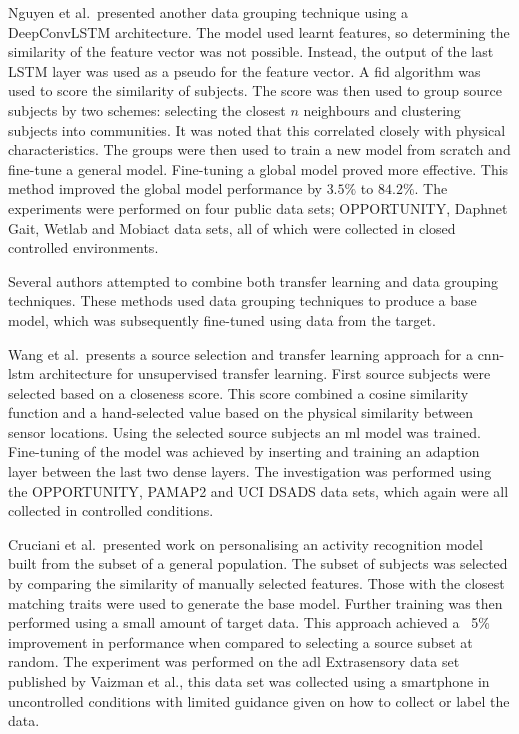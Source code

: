 Nguyen et al.~presented another data grouping technique using a DeepConvLSTM architecture. The model used learnt features, so determining the similarity of the feature vector was not possible. Instead, the output of the last LSTM layer was used as a pseudo for the feature vector. A \acrfull{fid} algorithm was used to score the similarity of subjects. The score was then used to group source subjects by two schemes: selecting the closest $n$ neighbours and clustering subjects into communities. It was noted that this correlated closely with physical characteristics. The groups were then used to train a new model from scratch and fine-tune a general model. Fine-tuning a global model proved more effective. This method improved the global model performance by $3.5\%$ to $84.2\%$. The experiments were performed on four public data sets; OPPORTUNITY\cite{Roggen2009}, Daphnet Gait\cite{Sigcha2020}, Wetlab\cite{Scholl2015} and Mobiact\cite{Vavoulas2016} data sets, all of which were collected in closed controlled environments.\cite{Nguyen2021}

Several authors attempted to combine both transfer learning and data grouping techniques. These methods used data grouping techniques to produce a base model, which was subsequently fine-tuned using data from the target.

Wang et al.~presents a source selection and transfer learning approach for a \acrshort{cnn}-\acrshort{lstm} architecture for unsupervised transfer learning. First source subjects were selected based on a closeness score. This score combined a cosine similarity function and a hand-selected value based on the physical similarity between sensor locations. Using the selected source subjects an \acrshort{ml} model was trained. Fine-tuning of the model was achieved by inserting and training an adaption layer between the last two dense layers. The investigation was performed using the OPPORTUNITY\cite{Roggen2009}, PAMAP2\cite{Reiss2012} and UCI DSADS\cite{Altun2010} data sets, which again were all collected in controlled conditions.\cite{Wang2018a}

Cruciani et al.~presented work on personalising an activity recognition model built from the subset of a general population. The subset of subjects was selected by comparing the similarity of manually selected features. Those with the closest matching traits were used to generate the base model. Further training was then performed using a small amount of target data. This approach achieved a ~5\% improvement in performance when compared to selecting a source subset at random\cite{Cruciani2020}. The experiment was performed on the \acrshort{adl} Extrasensory data set published by Vaizman et al.\cite{Vaizman2017}, this data set was collected using a smartphone in uncontrolled conditions with limited guidance given on how to collect or label the data.


